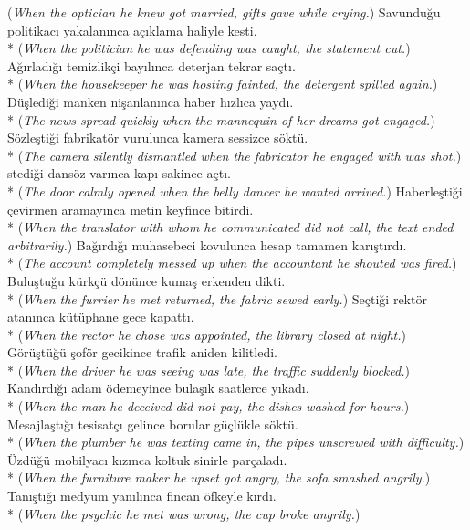 ({\it * When the optician he knew got married, gifts gave while crying.})
\ex * Savundu\u{g}u politikac{\i} yakalan{\i}nca a\c{c}{\i}klama haliyle kesti. \\*
({\it * When the politician he was defending was caught, the statement cut.})
\ex * A\u{g}{\i}rlad{\i}\u{g}{\i} temizlik\c{c}i bay{\i}l{\i}nca deterjan tekrar sa\c{c}t{\i}. \\*
({\it * When the housekeeper he was hosting fainted, the detergent spilled again.})
\ex * D\"{u}\c{s}ledi\u{g}i manken ni\c{s}anlan{\i}nca haber h{\i}zl{\i}ca yayd{\i}. \\*
({\it * The news spread quickly when the mannequin of her dreams got engaged.})
\ex * S\"{o}zle\c{s}ti\u{g}i fabrikat\"{o}r vurulunca kamera sessizce s\"{o}kt\"{u}. \\*
({\it * The camera silently dismantled when the fabricator he engaged with was shot.})
stedi\u{g}i dans\"{o}z var{\i}nca kap{\i} sakince a\c{c}t{\i}. \\*
({\it * The door calmly opened when the belly dancer he wanted arrived.})
\ex * Haberle\c{s}ti\u{g}i \c{c}evirmen aramay{\i}nca metin keyfince bitirdi. \\*
({\it * When the translator with whom he communicated did not call, the text ended arbitrarily.})
\ex * Ba\u{g}{\i}rd{\i}\u{g}{\i} muhasebeci kovulunca hesap tamamen kar{\i}\c{s}t{\i}rd{\i}. \\*
({\it * The account completely messed up when the accountant he shouted was fired.})
\ex * Bulu\c{s}tu\u{g}u k\"{u}rk\c{c}\"{u} d\"{o}n\"{u}nce kuma\c{s} erkenden dikti. \\*
({\it * When the furrier he met returned, the fabric sewed early.})
\ex * Se\c{c}ti\u{g}i rekt\"{o}r atan{\i}nca k\"{u}t\"{u}phane gece kapatt{\i}. \\*
({\it * When the rector he chose was appointed, the library closed at night.})
\ex * G\"{o}r\"{u}\c{s}t\"{u}\u{g}\"{u} \c{s}of\"{o}r gecikince trafik aniden kilitledi. \\*
({\it * When the driver he was seeing was late, the traffic suddenly blocked.})
\ex * Kand{\i}rd{\i}\u{g}{\i} adam \"{o}demeyince bula\c{s}{\i}k saatlerce y{\i}kad{\i}. \\*
({\it * When the man he deceived did not pay, the dishes washed for hours.})
\ex * Mesajla\c{s}t{\i}\u{g}{\i} tesisat\c{c}{\i} gelince borular g\"{u}\c{c}l\"{u}kle s\"{o}kt\"{u}. \\*
({\it * When the plumber he was texting came in, the pipes unscrewed with difficulty.})
\ex * \"{U}zd\"{u}\u{g}\"{u} mobilyac{\i} k{\i}z{\i}nca koltuk sinirle par\c{c}alad{\i}. \\*
({\it * When the furniture maker he upset got angry, the sofa smashed angrily.})
\ex * Tan{\i}\c{s}t{\i}\u{g}{\i} medyum yan{\i}l{\i}nca fincan \"{o}fkeyle k{\i}rd{\i}. \\*
({\it * When the psychic he met was wrong, the cup broke angrily.})
\z
\z

\newpage